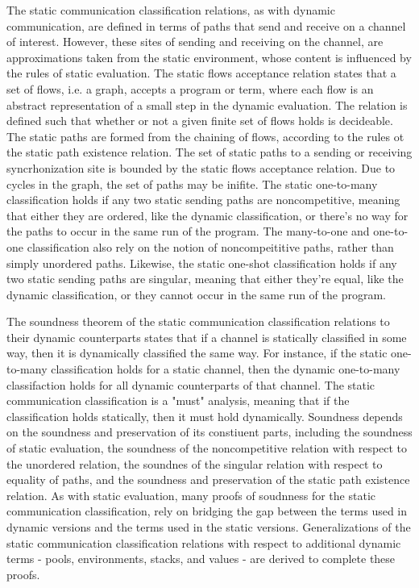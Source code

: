 \documentclass[letterpaper, 11pt]{extarticle}
\begin{document}
The static communication classification relations, as with dynamic communication, are defined in terms of paths
that send and receive on a channel of interest. However, these sites of sending and receiving on the channel, are approximations
taken from the static environment, whose content is influenced by the rules of static evaluation.
The static flows acceptance relation states that a set of flows, i.e. a graph, accepts a program or term, where each flow is
an abstract representation of a small step in the dynamic evaluation. The relation is defined such that
whether or not a given finite set of flows holds is decideable. The static paths are formed from the chaining of flows, according
to the rules ot the static path existence relation.
The set of static paths to a sending or receiving syncrhonization site is bounded by the static flows acceptance
relation. Due to cycles in the graph, the set of paths may be inifite. 
The static one-to-many classification holds if any two static sending paths are noncompetitive, meaning
that either they are ordered, like the dynamic classification, or there's no way for the paths to occur in the same run
of the program. The many-to-one and one-to-one classification also rely on the notion of noncompeititive paths, rather than
simply unordered paths. Likewise, the static one-shot classification holds if any two static sending paths are singular,
meaning that either they're equal, like the dynamic classification, or they cannot occur in the same run of the program.

The soundness theorem of the static communication classification relations to their dynamic counterparts states that if
a channel is statically classified in some way, then it is dynamically classified the same way. For instance, if the
static one-to-many classification holds for a static channel, then the dynamic one-to-many classifaction holds for
all dynamic counterparts of that channel. The static communication classification is a "must" analysis, meaning that
if the classification holds statically, then it must hold dynamically. Soundness depends on the soundness and preservation
of its constiuent parts,
including the soundness of static evaluation, the soundness of the noncompetitive relation with respect to
the unordered relation, the soundnes of the singular relation with respect to equality of paths,
and the soundness and preservation of the static path existence relation. As with static evaluation, many proofs of
soudnness for the static communication classification, rely on bridging the gap between the terms used in dynamic
versions and the terms used in the static versions. Generalizations of the static communication classification relations
with respect to additional dynamic terms - pools, environments, stacks, and values - are derived to complete these proofs.
\end{document}

